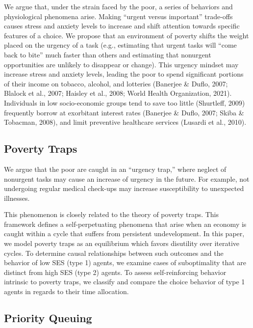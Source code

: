 We argue that, under the strain faced by the poor, a series of behaviors
and physiological phenomena arise. Making ``urgent versus important''
trade-offs causes stress and anxiety levels to increase and shift
attention towards specific features of a choice. We propose that an
environment of poverty shifts the weight placed on the urgency of a task
(e.g., estimating that urgent tasks will ``come back to bite'' much
faster than others and estimating that nonurgent opportunities are
unlikely to disappear or change). This urgency mindset may increase
stress and anxiety levels, leading the poor to spend significant
portions of their income on tobacco, alcohol, and lotteries (Banerjee \&
Duflo, 2007; Blalock et al., 2007; Haisley et al., 2008; World Health
Organization, 2021). Individuals in low socio-economic groups tend to
save too little (Shurtleff, 2009) frequently borrow at exorbitant
interest rates (Banerjee \& Duflo, 2007; Skiba \& Tobacman, 2008), and
limit preventive healthcare services (Lusardi et al., 2010).

\hypertarget{poverty-traps}{%
\subsection{Poverty Traps}\label{poverty-traps}}

We argue that the poor are caught in an ``urgency trap,'' where neglect
of nonurgent tasks may cause an increase of urgency in the future. For
example, not undergoing regular medical check-ups may increase
susceptibility to unexpected illnesses.

This phenomenon is closely related to the theory of poverty traps. This
framework defines a self-perpetuating phenomena that arise when an
economy is caught within a cycle that suffers from persistent
undevelopment. In this paper, we model poverty traps as an equilibrium
which favors disutility over iterative cycles. To determine causal
relationships between such outcomes and the behavior of low SES (type 1)
agents, we examine cases of suboptimality that are distinct from high
SES (type 2) agents. To assess self-reinforcing behavior intrinsic to
poverty traps, we classify and compare the choice behavior of type 1
agents in regards to their time allocation.

\hypertarget{priority-queuing}{%
\subsection{Priority Queuing}\label{priority-queuing}}

